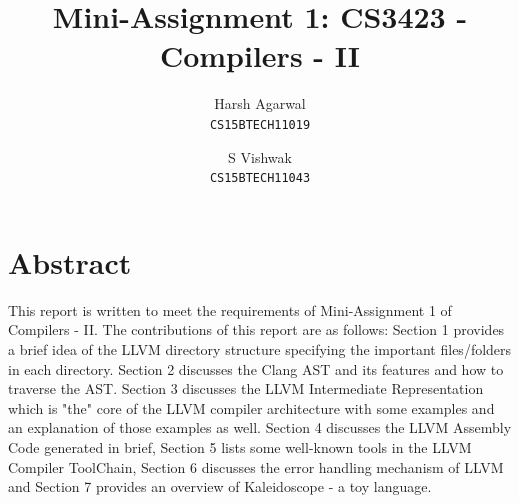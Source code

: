 \documentclass{article}
\title{Mini-Assignment 1: CS3423 - Compilers - II}
\author{Harsh Agarwal\\
\texttt{CS15BTECH11019}
\and S Vishwak\\
\texttt{CS15BTECH11043}}
\date{}
\begin{document}
\maketitle

\section*{Abstract}
This report is written to meet the requirements of Mini-Assignment 1 of Compilers - II. The contributions of this report are as follows: Section 1 provides a brief idea of the LLVM directory structure specifying the important files/folders in each directory. Section 2 discusses the Clang AST and its features and how to traverse the AST. Section 3 discusses the LLVM Intermediate Representation which is "the" core of the LLVM compiler architecture with some examples and an explanation of those examples as well. Section 4 discusses the LLVM Assembly Code generated in brief, Section 5 lists some well-known tools in the LLVM Compiler ToolChain, Section 6 discusses the error handling mechanism of LLVM and Section 7 provides an overview of Kaleidoscope - a toy language.
\end{document}
